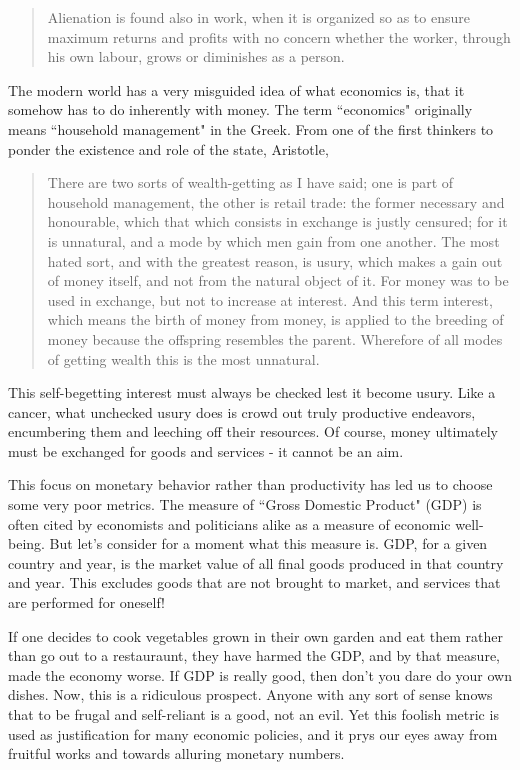 \documentclass[letterpaper]{article}
\begin{document}
\begin{quote}
  Alienation is found also in work, when it is organized so as to ensure maximum returns and profits with no concern whether the worker, through his own labour, grows or diminishes as a person.
\end{quote}

The modern world has a very misguided idea of what economics is, that it somehow has to do inherently with money. The term ``economics" originally means ``household management" in the Greek. From one of the first thinkers to ponder the existence and role of the state, Aristotle,

\begin{quote}
  There are two sorts of wealth-getting as I have said; one is part of household management, the other is retail trade: the former necessary and honourable, which that which consists in exchange is justly censured; for it is unnatural, and a mode by which men gain from one another. The most hated sort, and with the greatest reason, is usury, which makes a gain out of money itself, and not from the natural object of it. For money was to be used in exchange, but not to increase at interest. And this term interest, which means the birth of money from money, is applied to the breeding of money because the offspring resembles the parent. Wherefore of all modes of getting wealth this is the most unnatural.
\end{quote}

This self-begetting interest must always be checked lest it become usury. Like a cancer, what unchecked usury does is crowd out truly productive endeavors, encumbering them and leeching off their resources. Of course, money ultimately must be exchanged for goods and services - it cannot be an aim.

This focus on monetary behavior rather than productivity has led us to choose some very poor metrics. The measure of ``Gross Domestic Product" (GDP) is often cited by economists and politicians alike as a measure of economic well-being. But let's consider for a moment what this measure is. GDP, for a given country and year, is the market value of all final goods produced in that country and year. This excludes goods that are not brought to market, and services that are performed for oneself!

If one decides to cook vegetables grown in their own garden and eat them rather than go out to a restauraunt, they have harmed the GDP, and by that measure, made the economy worse. If GDP is really good, then don't you dare do your own dishes. Now, this is a ridiculous prospect. Anyone with any sort of sense knows that to be frugal and self-reliant is a good, not an evil. Yet this foolish metric is used as justification for many economic policies, and it prys our eyes away from fruitful works and towards alluring monetary numbers.
\end{document}
